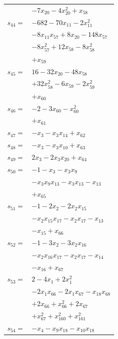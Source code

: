 \begin{longtable}{@{}r@{\;}l@{}}
 & \(\displaystyle -7x_{20} -4x_{20}^{2} +x_{58}\) \\[3pt]
\(s_{44}=\) & \(\displaystyle -682 -70x_{11} -2x_{11}^{2}\) \\
 & \(\displaystyle -8x_{11}x_{57} +8x_{20} -148x_{57}\) \\
 & \(\displaystyle -8x_{57}^{2} +12x_{58} -8x_{58}^{2}\) \\
 & \(\displaystyle +x_{59}\) \\[3pt]
\(s_{45}=\) & \(\displaystyle 16 -32x_{20} -48x_{58}\) \\
 & \(\displaystyle +32x_{58}^{2} -6x_{59} -2x_{59}^{2}\) \\
 & \(\displaystyle +x_{60}\) \\[3pt]
\(s_{46}=\) & \(\displaystyle -2 -3x_{60} -x_{60}^{2}\) \\
 & \(\displaystyle +x_{61}\) \\[3pt]
\(s_{47}=\) & \(\displaystyle -x_{3} -x_{3}x_{14} +x_{62}\) \\[3pt]
\(s_{48}=\) & \(\displaystyle -x_{3} -x_{3}x_{10} +x_{63}\) \\[3pt]
\(s_{49}=\) & \(\displaystyle 2x_{3} -2x_{3}x_{20} +x_{64}\) \\[3pt]
\(s_{50}=\) & \(\displaystyle -1 -x_{3} -x_{3}x_{9}\) \\
 & \(\displaystyle -x_{3}x_{9}x_{13} -x_{3}x_{13} -x_{13}\) \\
 & \(\displaystyle +x_{65}\) \\[3pt]
\(s_{51}=\) & \(\displaystyle -1 -2x_{2} -2x_{2}x_{15}\) \\
 & \(\displaystyle -x_{2}x_{15}x_{17} -x_{2}x_{17} -x_{13}\) \\
 & \(\displaystyle -x_{15} +x_{66}\) \\[3pt]
\(s_{52}=\) & \(\displaystyle -1 -3x_{2} -3x_{2}x_{16}\) \\
 & \(\displaystyle -x_{2}x_{16}x_{17} -x_{2}x_{17} -x_{14}\) \\
 & \(\displaystyle -x_{16} +x_{67}\) \\[3pt]
\(s_{53}=\) & \(\displaystyle 2 -4x_{1} +2x_{1}^{2}\) \\
 & \(\displaystyle -2x_{1}x_{66} -2x_{1}x_{67} -x_{18}x_{68}\) \\
 & \(\displaystyle +2x_{66} +x_{66}^{2} +2x_{67}\) \\
 & \(\displaystyle +x_{67}^{2} +x_{160}^{2} +x_{161}^{2}\) \\[3pt]
\(s_{54}=\) & \(\displaystyle -x_{4} -x_{9}x_{18} -x_{10}x_{18}\) \\

\end{longtable}
